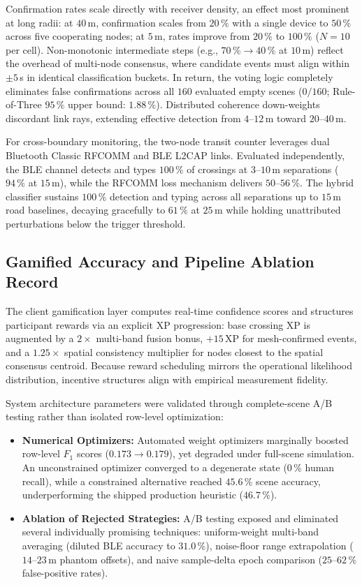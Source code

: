\documentclass[journal,10pt]{IEEEtran}
\begin{document}
Confirmation rates scale directly with receiver density, an effect most prominent at long radii: at $40$\,m, confirmation scales from $20\,\%$ with a single device to $50\,\%$ across five cooperating nodes; at $5$\,m, rates improve from $20\,\%$ to $100\,\%$ ($N = 10$ per cell). Non-monotonic intermediate steps (e.g., $70\,\% \to 40\,\%$ at $10$\,m) reflect the overhead of multi-node consensus, where candidate events must align within $\pm 5$\,s in identical classification buckets. In return, the voting logic completely eliminates false confirmations across all $160$ evaluated empty scenes ($0/160$; Rule-of-Three $95\,\%$ upper bound: $1.88\,\%$). Distributed coherence down-weights discordant link rays, extending effective detection from $4$--$12$\,m toward $20$--$40$\,m.

For cross-boundary monitoring, the two-node transit counter leverages dual Bluetooth Classic RFCOMM and BLE L2CAP links. Evaluated independently, the BLE channel detects and types $100\,\%$ of crossings at $3$--$10$\,m separations ($94\,\%$ at $15$\,m), while the RFCOMM loss mechanism delivers $50$--$56\,\%$. The hybrid classifier sustains $100\,\%$ detection and typing across all separations up to $15$\,m road baselines, decaying gracefully to $61\,\%$ at $25$\,m while holding unattributed perturbations below the trigger threshold.

\subsection{Gamified Accuracy and Pipeline Ablation Record}
The client gamification layer computes real-time confidence scores and structures participant rewards via an explicit XP progression: base crossing XP is augmented by a $2\times$ multi-band fusion bonus, $+15$\,XP for mesh-confirmed events, and a $1.25\times$ spatial consistency multiplier for nodes closest to the spatial consensus centroid. Because reward scheduling mirrors the operational likelihood distribution, incentive structures align with empirical measurement fidelity.

System architecture parameters were validated through complete-scene A/B testing rather than isolated row-level optimization:
\begin{itemize}
    \item \textbf{Numerical Optimizers:} Automated weight optimizers marginally boosted row-level $F_1$ scores ($0.173 \to 0.179$), yet degraded under full-scene simulation. An unconstrained optimizer converged to a degenerate state ($0\,\%$ human recall), while a constrained alternative reached $45.6\,\%$ scene accuracy, underperforming the shipped production heuristic ($46.7\,\%$).
    \item \textbf{Ablation of Rejected Strategies:} A/B testing exposed and eliminated several individually promising techniques: uniform-weight multi-band averaging (diluted BLE accuracy to $31.0\,\%$), noise-floor range extrapolation ($14$--$23$\,m phantom offsets), and naive sample-delta epoch comparison ($25$--$62\,\%$ false-positive rates).
\end{itemize}
\end{document}
